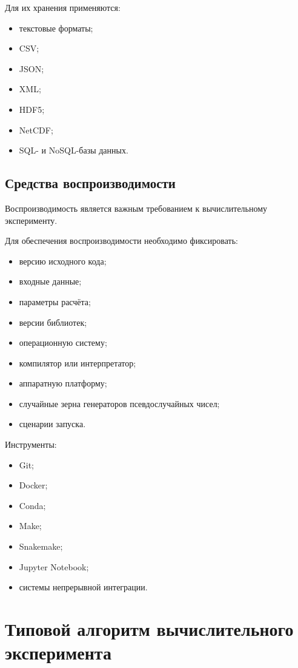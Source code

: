 \documentclass[12pt,a4paper]{article}
\theoremstyle{definition}
\theoremstyle{plain}
\begin{document}
Для их хранения применяются:
\begin{itemize}
    \item текстовые форматы;
    \item CSV;
    \item JSON;
    \item XML;
    \item HDF5;
    \item NetCDF;
    \item SQL- и NoSQL-базы данных.
\end{itemize}

\subsection{Средства воспроизводимости}

Воспроизводимость является важным требованием к вычислительному эксперименту.

Для обеспечения воспроизводимости необходимо фиксировать:
\begin{itemize}
    \item версию исходного кода;
    \item входные данные;
    \item параметры расчёта;
    \item версии библиотек;
    \item операционную систему;
    \item компилятор или интерпретатор;
    \item аппаратную платформу;
    \item случайные зерна генераторов псевдослучайных чисел;
    \item сценарии запуска.
\end{itemize}

Инструменты:
\begin{itemize}
    \item Git;
    \item Docker;
    \item Conda;
    \item Make;
    \item Snakemake;
    \item Jupyter Notebook;
    \item системы непрерывной интеграции.
\end{itemize}

\section{Типовой алгоритм вычислительного эксперимента}
\end{document}
